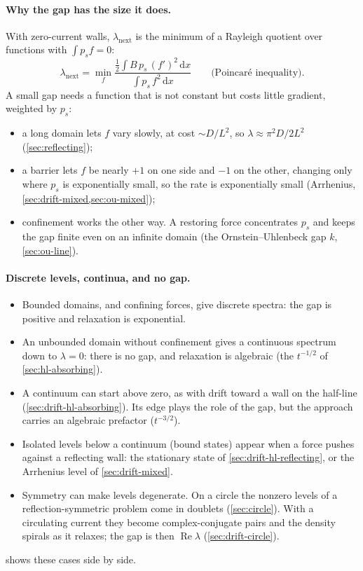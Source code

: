 \documentclass[11pt]{article}
\numberwithin{equation}{section}
\newcommand{\dd}{\mathrm{d}}
\begin{document}
\paragraph{Why the gap has the size it does.} With zero-current walls, $\lambda_{\text{next}}$ is the minimum
of a Rayleigh quotient over functions with $\int p_sf=0$:
\begin{equation}
  \lambda_{\text{next}}=\min_f\frac{\tfrac12\int B\,p_s\,(f')^2\,\dd x}{\int p_s\,f^2\,\dd x}
  \qquad\text{(Poincar\'e inequality)}.
  \label{eq:rayleigh}
\end{equation}
A small gap needs a function that is not constant but costs little gradient, weighted by $p_s$:
\begin{itemize}
  \item a long domain lets $f$ vary slowly, at cost $\sim D/L^2$, so $\lambda\approx\pi^2D/2L^2$
        (\cref{sec:reflecting});
  \item a barrier lets $f$ be nearly $+1$ on one side and $-1$ on the other, changing only where $p_s$ is
        exponentially small, so the rate is exponentially small (Arrhenius, \cref{sec:drift-mixed,sec:ou-mixed});
  \item confinement works the other way. A restoring force concentrates $p_s$ and keeps the gap finite even
        on an infinite domain (the Ornstein--Uhlenbeck gap $k$, \cref{sec:ou-line}).
\end{itemize}

\paragraph{Discrete levels, continua, and no gap.}
\begin{itemize}
  \item Bounded domains, and confining forces, give discrete spectra: the gap is positive and relaxation is
        exponential.
  \item An unbounded domain without confinement gives a continuous spectrum down to $\lambda=0$: there is no
        gap, and relaxation is algebraic (the $t^{-1/2}$ of \cref{sec:hl-absorbing}).
  \item A continuum can start above zero, as with drift toward a wall on the half-line
        (\cref{sec:drift-hl-absorbing}). Its edge plays the role of the gap, but the approach carries an
        algebraic prefactor ($t^{-3/2}$).
  \item Isolated levels below a continuum (bound states) appear when a force pushes against a reflecting
        wall: the stationary state of \cref{sec:drift-hl-reflecting}, or the Arrhenius level of
        \cref{sec:drift-mixed}.
  \item Symmetry can make levels degenerate. On a circle the nonzero levels of a reflection-symmetric
        problem come in doublets (\cref{sec:circle}). With a circulating current they become complex-conjugate
        pairs and the density spirals as it relaxes; the gap is then $\operatorname{Re}\lambda$
        (\cref{sec:drift-circle}).
\end{itemize}
 shows these cases side by side.
\end{document}

